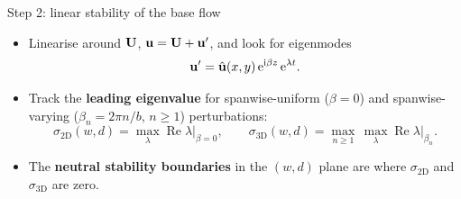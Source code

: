 \documentclass[aspectratio=43, xcolor=table]{beamer}
\begin{document}
\begin{frame}{Step 2: linear stability of the base flow}
	\begin{itemize}
		\setlength\itemsep{0.8em}
		\item Linearise around $\boldsymbol{\mathrm{U}}$, $\boldsymbol{\mathrm{u}}=\boldsymbol{\mathrm{U}}+\boldsymbol{\mathrm{u}}'$, and look for eigenmodes
		      $$\boldsymbol{\mathrm{u}}' = \hat{\boldsymbol{\mathrm{u}}}(x,y)\,\mathrm{e}^{\mathrm{i}\beta z}\,\mathrm{e}^{\lambda t}.$$\pause
		\item Track the \textbf{leading eigenvalue} for spanwise-uniform ($\beta=0$) and spanwise-varying ($\beta_n=2\pi n/b$, $n\geq1$) perturbations:
		      $$\sigma_\text{2D}(w,d) = \max_\lambda \operatorname{Re}\lambda\big|_{\beta=0}, \qquad \sigma_\text{3D}(w,d) = \max_{n\geq1}\, \max_\lambda \operatorname{Re}\lambda\big|_{\beta_n}.$$\pause
		\item The \textbf{neutral stability boundaries} in the $(w,d)$ plane are where $\sigma_\text{2D}$ and $\sigma_\text{3D}$ are zero.
	\end{itemize}
\end{frame}
\end{document}
